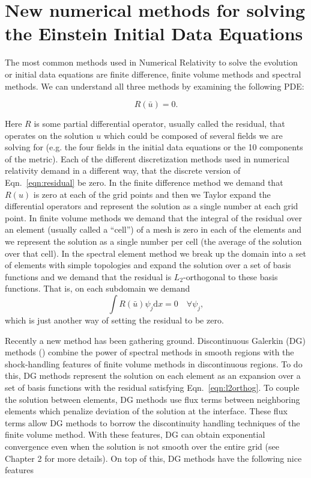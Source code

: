 \section{New numerical methods for solving the Einstein Initial Data Equations}

The most common methods used in Numerical Relativity to solve the evolution or initial data equations are finite difference, finite volume methods and spectral methods. We can understand all three methods by examining the following PDE:

\begin{equation}
  \label{eqn:residual}
 R(\bar u) = 0.
\end{equation}

Here $R$ is some partial differential operator, usually called the residual, that operates on the solution $u$ which could be composed of several fields we are solving for (e.g. the four fields in the initial data equations or the 10 components of the metric). Each of the different discretization methods used in numerical relativity demand in a different way, that the discrete version of Eqn.~\ref{eqn:residual} be zero. In the finite difference method we demand that $R(u)$ is zero at each of the grid points and then we Taylor expand the differential operators and represent the solution as a single number at each grid point. In finite volume methods we demand that the integral of the residual over an element (usually called a ``cell'') of a mesh is zero in each of the elements and we represent the solution as a single number per cell (the average of the solution over that cell). In the spectral element method we break up the domain into a set of elements with simple topologies and expand the solution over a set of basis functions and we demand that the residual is $L_2$-orthogonal to these basis functions. That is, on each subdomain we demand
%
\begin{equation}
  \label{eqn:l2orthog}
 \int R(\bar u)\psi_j  \mathrm{d}x = 0 \quad \forall \psi_j,
\end{equation}
%
which is just another way of setting the residual to be zero.

Recently a new method has been gathering ground. Discontinuous Galerkin (DG) methods (\cite{hesthaven2008nodal,kidder2016spectre}) combine the power of spectral methods in smooth regions with the shock-handling features of finite volume methods in discontinuous regions. To do this, DG methods represent the solution on each element as an expansion over a set of basis functions with the residual satisfying Eqn.~\ref{eqn:l2orthog}. To couple the solution between elements, DG methods use flux terms between neighboring elements which penalize deviation of the solution at the interface. These flux terms allow DG methods to borrow the discontinuity handling techniques of the finite volume method. With these features, DG can obtain exponential convergence even when the solution is not smooth over the entire grid (see Chapter 2 for more details). On top of this, DG methods have the following nice features


